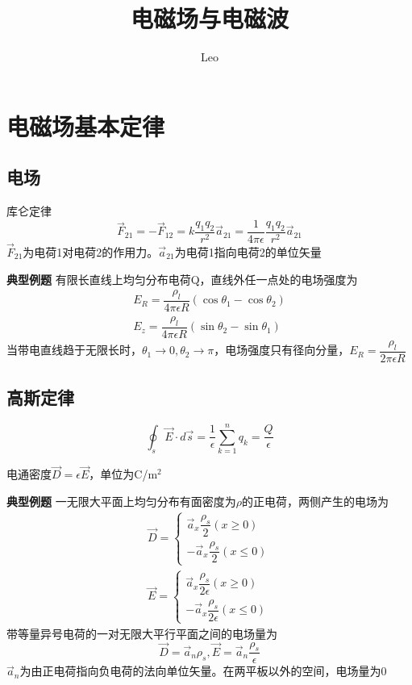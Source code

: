 \documentclass{ctexart}
\title{电磁场与电磁波}
\author{Leo}
\begin{document}
\newcommand{\noindentbf}[1]{\noindent \textbf{#1} \quad}
\newcommand{\noindentbfline}[1]{\noindent \textbf{#1} \newline}


\maketitle
\tableofcontents
\section{电磁场基本定律}
\subsection{电场}
库仑定律
\begin{equation}
    \vec{F}_{21}=- \vec{F}_{12}=k\dfrac{q_1 q_2}{r^2}\vec{a}_{21}=\dfrac{1}{4\pi \epsilon}\dfrac{q_1 q_2}{r^2}\vec{a}_{21}
\end{equation}
$\vec{F}_{21}$为电荷1对电荷2的作用力。$\vec{a}_{21}$为电荷1指向电荷2的单位矢量

\noindentbfline{典型例题}
有限长直线上均匀分布电荷Q，直线外任一点处的电场强度为
\begin{align}
    E_R=\dfrac{\rho_l}{4\pi \epsilon R}(\cos \theta_1-\cos \theta_2)\\
    E_z=\dfrac{\rho_l}{4\pi \epsilon R}(\sin \theta_2-\sin \theta_1)
\end{align}
当带电直线趋于无限长时，$\theta_1 \to 0,\theta_2 \to \pi$，电场强度只有径向分量，$E_R=\dfrac{\rho_l}{2\pi \epsilon R}$
\subsection{高斯定律}
\begin{equation}
    \oint_s \vec{E}\cdot d\vec{s}=\dfrac{1}{\epsilon}\sum_{k=1}^{n}q_k=\dfrac{Q}{\epsilon}
\end{equation}

电通密度$\vec{D}=\epsilon \vec{E}$，单位为C/m$^2$

\noindentbfline{典型例题}
一无限大平面上均匀分布有面密度为$\rho$的正电荷，两侧产生的电场为
\begin{align}
    \vec{D}=
    \begin{cases}
        \vec{a}_x\dfrac{\rho_s}{2}(x\geq 0)\\
        -\vec{a}_x\dfrac{\rho_s}{2}(x\leq 0)
    \end{cases}
    \\
    \vec{E}=
    \begin{cases}
        \vec{a}_x\dfrac{\rho_s}{2\epsilon}(x\geq 0)\\
        -\vec{a}_x\dfrac{\rho_s}{2\epsilon}(x\leq 0)
    \end{cases}
\end{align}
带等量异号电荷的一对无限大平行平面之间的电场量为
\begin{equation}
    \vec{D}=\vec{a}_n\rho_s,\vec{E}=\vec{a}_n\dfrac{\rho_s}{\epsilon}
\end{equation}
$\vec{a}_n$为由正电荷指向负电荷的法向单位矢量。在两平板以外的空间，电场量为0
\end{document}
